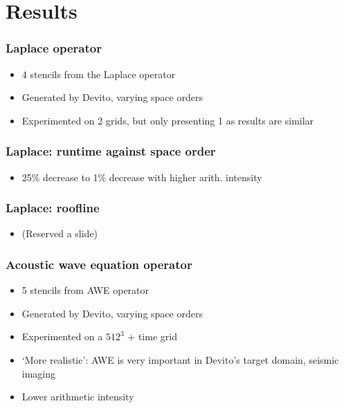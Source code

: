 \documentclass{beamer}
\begin{document}
\section{Results}

\begin{frame}
\frametitle{Laplace operator}

\begin{itemize}
	\item 4 stencils from the Laplace operator
	\item Generated by Devito, varying space orders
	\item Experimented on 2 grids, but only presenting 1 as results are similar
\end{itemize}
\end{frame}



\begin{frame}
\frametitle{Laplace: runtime against space order}

\begin{center}
\end{center}
\begin{itemize}
	\item 25\% decrease to 1\% decrease with higher arith. intensity
\end{itemize}
\end{frame}



\begin{frame}
\frametitle{Laplace: roofline}

\begin{itemize}
	\item (Reserved a slide)
\end{itemize}
\end{frame}



\begin{frame}
\frametitle{Acoustic wave equation operator}

\begin{itemize}
	\item 5 stencils from AWE operator
	\item Generated by Devito, varying space orders
	\item Experimented on a \(512^3\) + time grid
	\item `More realistic': AWE is very important in Devito's target domain, seismic imaging
	\item Lower arithmetic intensity
\end{itemize}
\end{frame}
\end{document}
